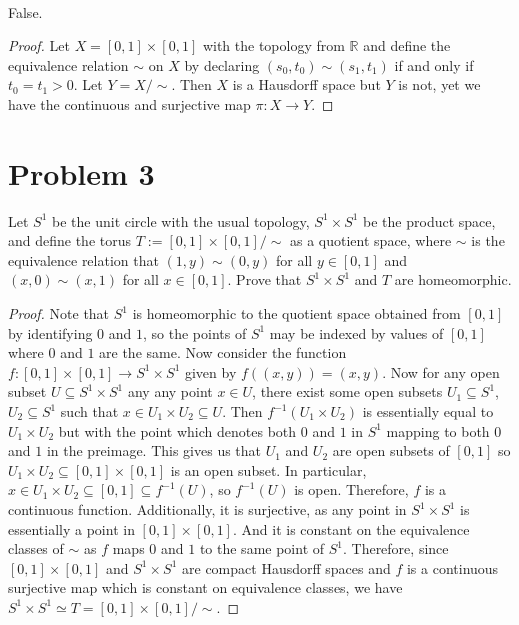 \documentclass[12pt]{article}
\newenvironment{problem}
    {\begin{lrbox}{\mybox}\begin{minipage}{\textwidth-10pt}}
    {\end{minipage}\end{lrbox}\framebox[6.5in]{\usebox{\mybox}}}
\newenvironment{response}{\paragraph{}}{}
\newcommand{\R}{\mathbb{R}}
\begin{document}
\begin{response}
    False.
\end{response}

\begin{proof}
    Let $X=[0,1]\times[0,1]$ with the topology from $\R$ and define the equivalence relation $\sim$ on $X$ by declaring $(s_0,t_0)\sim (s_1,t_1)$ if and only if $t_0=t_1>0$. Let $Y=X/\sim$. Then $X$ is a Hausdorff space but $Y$ is not, yet we have the continuous and surjective map $\pi:X\to Y$.
    
\end{proof}

\section*{Problem 3}
\begin{problem}
    Let $S^1$ be the unit circle with the usual topology, $S^1\times S^1$ be the product space, and define the torus $T:=[0,1]\times[0,1]/\sim$ as a quotient space, where $\sim$ is the equivalence relation that $(1,y)\sim(0,y)$ for all $y\in[0,1]$ and $(x,0)\sim(x,1)$ for all $x\in[0,1]$. Prove that $S^1\times S^1$ and $T$ are homeomorphic.
\end{problem}

\begin{proof}
    Note that $S^1$ is homeomorphic to the quotient space obtained from $[0,1]$ by identifying $0$ and $1$, so the points of $S^1$ may be indexed by values of $[0,1]$ where $0$ and $1$ are the same. Now consider the function $f:[0,1]\times[0,1]\to S^1\times S^1$ given by $f((x,y))=(x,y)$. Now for any open subset $U\subseteq S^1\times S^1$ any any point $x\in U$, there exist some open subsets $U_1\subseteq S^1$, $U_2\subseteq S^1$ such that $x\in U_1\times U_2 \subseteq U$. Then $f^{-1}(U_1\times U_2)$ is essentially equal to $U_1\times U_2$ but with the point which denotes both $0$ and $1$ in $S^1$ mapping to both $0$ and $1$ in the preimage. This gives us that $U_1$ and $U_2$ are open subsets of $[0,1]$ so $U_1\times U_2\subseteq[0,1]\times[0,1]$ is an open subset. In particular, $x\in U_1\times U_2\subseteq[0,1] \subseteq f^{-1}(U)$, so $f^{-1}(U)$ is open. Therefore, $f$ is a continuous function. Additionally, it is surjective, as any point in $S^1\times S^1$ is essentially a point in $[0,1]\times[0,1]$. And it is constant on the equivalence classes of $\sim$ as $f$ maps $0$ and $1$ to the same point of $S^1$. Therefore, since $[0,1]\times[0,1]$ and $S^1\times S^1$ are compact Hausdorff spaces and $f$ is a continuous surjective map which is constant on equivalence classes, we have $S^1\times S^1 \simeq T = [0,1]\times[0,1]/\sim$.
    
\end{proof}
\end{document}
